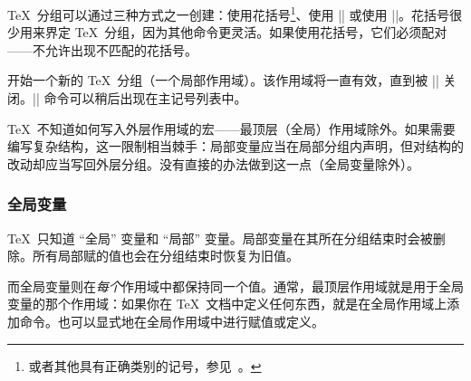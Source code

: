 \documentclass[a4paper,doc2]{ltxdoc}
\begin{document}
\TeX\ 分组可以通过三种方式之一创建：使用花括号\footnote{或者其他具有正确类别的记号，参见~\cite{texbook}。}、使用 |\begingroup| 或使用 |\bgroup|。花括号很少用来界定 \TeX\ 分组，因为其他命令更灵活。如果使用花括号，它们必须配对——不允许出现不匹配的花括号。
\begin{command}{\begingroup}
	开始一个新的 \TeX\ 分组（一个局部作用域）。该作用域将一直有效，直到被 |\endgroup| 关闭。|\endgroup| 命令可以稍后出现在主记号列表中。
\end{command}

\TeX\ 不知道如何写入外层作用域的宏——最顶层（全局）作用域除外。如果需要编写复杂结构，这一限制相当棘手：局部变量应当在局部分组内声明，但对结构的改动却应当写回外层分组。没有直接的办法做到这一点（全局变量除外）。

\subsubsection{全局变量}
\TeX\ 只知道 ``全局'' 变量和 ``局部'' 变量。局部变量在其所在分组结束时会被删除。所有局部赋的值也会在分组结束时恢复为旧值。

而全局变量则在\emph{每个}作用域中都保持同一个值。通常，最顶层作用域就是用于全局变量的那个作用域：如果你在 \TeX\ 文档中定义任何东西，就是在全局作用域上添加命令。也可以显式地在全局作用域中进行赋值或定义。

\end{document}
